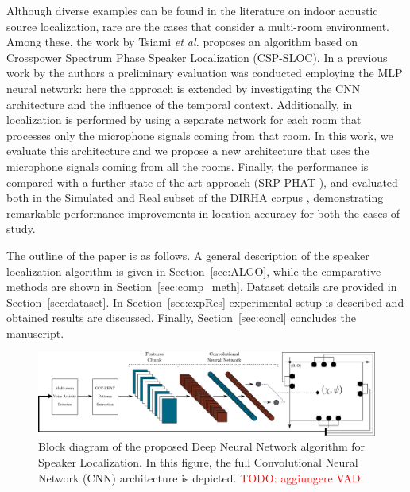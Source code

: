 \documentclass[review]{elsarticle}
\newcommand{\secref}[1]{Section~\ref{#1}}
\begin{document}
Although diverse examples can be found in the literature on indoor acoustic source localization, rare are the cases that consider a multi-room environment. Among these, the work by Tsiami \textit{et al.} \cite{tsiami2014experiments} proposes an algorithm based on Crosspower Spectrum Phase Speaker Localization (CSP-SLOC). 
In a previous work by the authors \cite{vesperini2016sloc} a preliminary evaluation was conducted employing the MLP neural network: here the approach is extended by investigating the CNN architecture and the influence of the temporal context. Additionally, in \cite{vesperini2016sloc} localization is performed by using a separate network for each room that processes only the microphone signals coming from that room. In this work, we evaluate this architecture and we propose a new architecture that uses the microphone signals coming from all the rooms. Finally, the performance is compared with a further state of the art approach (SRP-PHAT \cite{DoSY07}), and evaluated both in the Simulated and Real subset of the DIRHA corpus \cite{cristoforetti2014dirha}, demonstrating remarkable performance improvements in location accuracy for both the cases of study.


The outline of the paper is as follows. A general description of the speaker localization algorithm is given in  \secref{sec:ALGO}, while the comparative methods are shown in \secref{sec:comp_meth}. Dataset details are provided in \secref{sec:dataset}. In \secref{sec:expRes} experimental setup is described and obtained results are discussed.
Finally, \secref{sec:concl} concludes the manuscript.

\begin{figure}[t]
	\centering
	\includegraphics[width=\textwidth]{imgs/alg_2_2}
	\caption{Block diagram of the proposed Deep Neural Network algorithm for Speaker Localization. 	In this figure, the full Convolutional Neural Network (CNN) architecture is depicted. \textcolor{red}{TODO: aggiungere VAD.}}
	\label{fig:proposed_method}
\end{figure}
\end{document}
